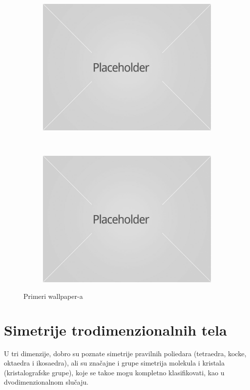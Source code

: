 \documentclass[times, utf8, diplomski]{fer}
\theoremstyle{plain}
\theoremstyle{definition}
\begin{document}
\begin{figure}[h]
\centering
\begin{subfigure}{0.4\textwidth}
\includegraphics[width=\textwidth]{placeholder}
\end{subfigure}
~
\begin{subfigure}{0.4\textwidth}
\includegraphics[width=\textwidth]{placeholder}
\end{subfigure}
\caption{Primeri wallpaper-a}
\end{figure}

\section{Simetrije trodimenzionalnih tela}
U tri dimenzije, dobro su poznate simetrije pravilnih poliedara (tetraedra, kocke, oktaedra i ikosaedra), ali su zna\v cajne i grupe simetrija molekula i kristala (kristalografske grupe), koje se tako\dj e mogu kompletno klasifikovati, kao u dvodimenzionalnom slu\v caju.
\end{document}
